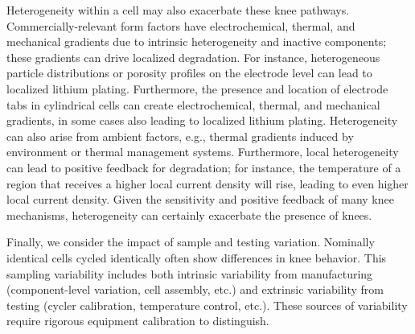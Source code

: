 \documentclass[journal=jpclcd,manuscript=article]{achemso}
\begin{document}
Heterogeneity within a cell may also exacerbate these knee pathways. Commercially-relevant form factors have electrochemical, thermal, and mechanical gradients due to intrinsic heterogeneity and inactive components; these gradients can drive localized degradation. For instance, heterogeneous particle distributions or porosity profiles on the electrode level can lead to localized lithium plating\cite{chung_particle_2014}. Furthermore, the presence and location of electrode tabs in cylindrical cells can create electrochemical, thermal, and mechanical gradients\cite{lee_three_2013, reimers_accurate_2014, senyshyn_homogeneity_2015, waldmann_influence_2015, waldmann_influence_2016, bach_nonlinear_2016, carter_detection_2019, yao_tab_2019, pfrang_geometrical_2019, li_optimal_2021}, in some cases also leading to localized lithium plating\cite{bach_nonlinear_2016, coron_impact_2020}. Heterogeneity can also arise from ambient factors, e.g., thermal gradients induced by environment or thermal management systems.\cite{werner_inhomogeneous_2020} Furthermore, local heterogeneity can lead to positive feedback for degradation; for instance, the temperature of a region that receives a higher local current density will rise, leading to even higher local current density. Given the sensitivity and positive feedback of many knee mechanisms, heterogeneity can certainly exacerbate the presence of knees.

Finally, we consider the impact of sample and testing variation. Nominally identical cells cycled identically often show differences in knee behavior. This sampling variability includes both intrinsic variability from manufacturing (component-level variation, cell assembly, etc.) and extrinsic variability from testing (cycler calibration, temperature control, etc.). These sources of variability require rigorous equipment calibration to distinguish.
\end{document}

